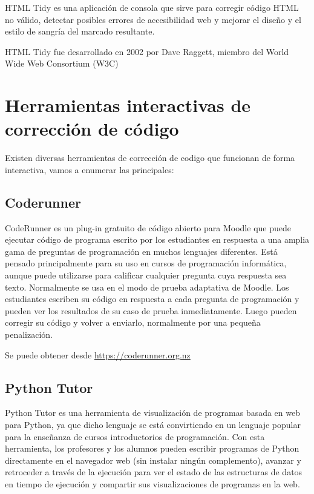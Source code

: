 HTML Tidy es una aplicación de consola que sirve para corregir código HTML no válido, detectar posibles errores de accesibilidad web y mejorar el diseño y el estilo de sangría del marcado resultante.

HTML Tidy fue desarrollado en 2002 por Dave Raggett, miembro del World Wide Web Consortium (W3C)

\section {Herramientas interactivas de corrección de código}

Existen diversas herramientas de corrección de codigo que funcionan de forma interactiva, vamos a enumerar las principales:

\subsection {Coderunner}

CodeRunner es un plug-in gratuito de código abierto para Moodle que puede ejecutar código de programa escrito por los estudiantes en respuesta a una amplia gama de preguntas de programación en muchos lenguajes diferentes. Está pensado principalmente para su uso en cursos de programación informática, aunque puede utilizarse para calificar cualquier pregunta cuya respuesta sea texto. Normalmente se usa en el modo de prueba adaptativa de Moodle. Los estudiantes escriben su código en respuesta a cada pregunta de programación y pueden ver los resultados de su caso de prueba inmediatamente. Luego pueden corregir su código y volver a enviarlo, normalmente por una pequeña penalización.

Se puede obtener desde \url{https://coderunner.org.nz}

\subsection {Python Tutor}

Python Tutor es una herramienta de visualización de programas basada en web para Python, ya que dicho lenguaje se está convirtiendo en un lenguaje popular para la enseñanza de cursos introductorios de programación. Con esta herramienta, los profesores y los alumnos pueden escribir programas de Python directamente en el navegador web (sin instalar ningún complemento), avanzar y retroceder a través de la ejecución para ver el estado de las estructuras de datos en tiempo de ejecución y compartir sus visualizaciones de programas en la web.


